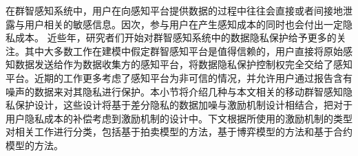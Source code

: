 在群智感知系统中，用户在向感知平台提供数据的过程中往往会直接或者间接地泄露与用户相关的敏感信息。因次，参与用户在产生感知成本的同时也会付出一定隐私成本。
近些年，研究者们开始对群智感知系统中的数据隐私保护给予更多的关注\cite{christin2011survey,dandekar2014privacy,ghosh2015selling,jin2016inception,zhang2016privacy,wang2016value,gong2017truthful}。其中大多数工作\cite{christin2011survey,dandekar2014privacy,ghosh2015selling,jin2016inception,zhang2016privacy}在建模中假定群智感知平台是值得信赖的，用户直接将原始感知数据发送给作为数据收集方的感知平台，将数据隐私保护控制权完全交给了感知平台。近期的工作\cite{wang2016value,wang2016buying}更多考虑了感知平台为非可信的情况，并允许用户通过报告含有噪声的数据来对其隐私进行保护。本小节将介绍几种与本文相关的移动群智感知隐私保护设计，这些设计将基于差分隐私的数据加噪与激励机制设计相结合，把对于用户隐私成本的补偿考虑到激励机制的设计中。下文根据所使用的激励机制的类型对相关工作进行分类，包括基于{\kaishu 拍卖模型}的方法，基于{\kaishu 博弈模型}的方法和基于{\kaishu 合约模型}的方法。







